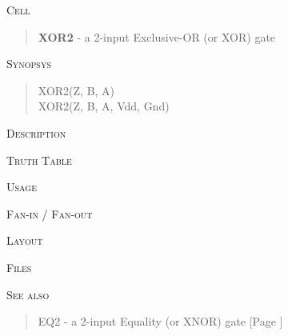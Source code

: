 
\label{XOR2}
\textsc{Cell}
\begin{quote}
    \textbf{XOR2} - a 2-input Exclusive-OR (or XOR) gate
\end{quote}

\textsc{Synopsys}
\begin{quote}
    XOR2(Z, B, A) \\
    XOR2(Z, B, A, Vdd, Gnd)
\end{quote}

\textsc{Description}

%

\textsc{Truth Table}


\textsc{Usage}

\textsc{Fan-in / Fan-out}

\textsc{Layout}

\textsc{Files}

\textsc{See also}
\begin{quote}
    EQ2 - a 2-input Equality (or XNOR) gate [Page \pageref{EQ2}]
\end{quote}

